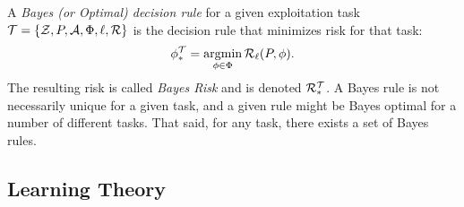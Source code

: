 \documentclass{article}
\begin{document}
\noindent  A \emph{Bayes (or Optimal) decision rule} for a given exploitation task $\mathcal{T}=\{\mathcal{Z}, P, \mathcal{A}, \Phi, \ell, \mathcal{R}\}$ is the decision rule that minimizes risk for that task: 
\begin{align}
    \phi_*^\mathcal{T} = \argmin_{\phi \in \Phi} \RR_\ell(P,\phi).
\end{align}
The resulting risk is called \emph{Bayes Risk} and is denoted $\mathcal{R}_*^{\mathcal{T}}$.  A Bayes rule is not necessarily unique for a given task, and a given rule might be Bayes optimal for a number of different tasks.  That said, for any task, there exists a set of Bayes rules.  


\subsection{Learning Theory}
\end{document}

